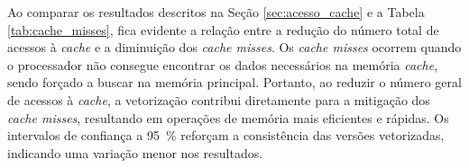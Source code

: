 \documentclass[12pt,a4paper]{article}
\begin{document}
Ao comparar os resultados descritos na Seção \ref{sec:acesso_cache} e a Tabela \ref{tab:cache_misses}, fica evidente a relação entre a redução do número total de acessos à \textit{cache} e a diminuição dos \textit{cache misses}. Os \textit{cache misses} ocorrem quando o processador não consegue encontrar os dados necessários na memória \textit{cache}, sendo forçado a buscar na memória principal. Portanto, ao reduzir o número geral de acessos à \textit{cache}, a vetorização contribui diretamente para a mitigação dos \textit{cache misses}, resultando em operações de memória mais eficientes e rápidas. Os intervalos de confiança a \SI{95}{\percent} reforçam a consistência das versões vetorizadas, indicando uma variação menor nos resultados. 

\begin{table}[H]
  \centering
  \caption{Número total de \textit{cache misses}, médias aritméticas e intervalos de confiança obtidos para os 10 experimentos realizados para o código sem vetorização, com vetorização pelo compilador e com vetorização \textit{intrinsics}}
  \label{tab:cache_misses}
\end{table}
\end{document}
